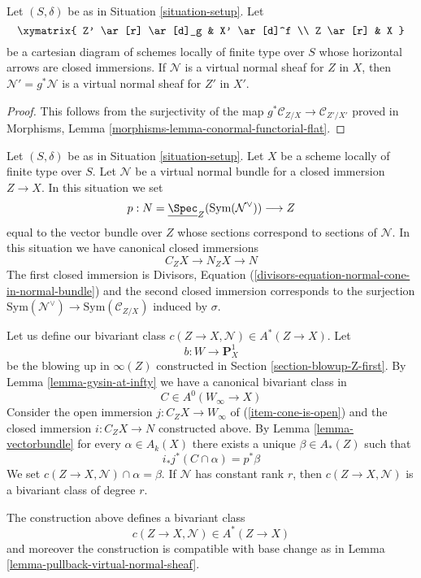 \begin{lemma}
\label{lemma-pullback-virtual-normal-sheaf}
Let $(S, \delta)$ be as in Situation \ref{situation-setup}. Let
$$
\xymatrix{
Z' \ar[r] \ar[d]_g & X' \ar[d]^f \\
Z \ar[r] & X
}
$$
be a cartesian diagram of schemes locally of finite type over $S$
whose horizontal arrows are closed immersions.
If $\mathcal{N}$ is a virtual normal sheaf for $Z$ in $X$, then
$\mathcal{N}' = g^*\mathcal{N}$ is a virtual normal sheaf for
$Z'$ in $X'$.
\end{lemma}

\begin{proof}
This follows from the surjectivity of the map
$g^*\mathcal{C}_{Z/X} \to \mathcal{C}_{Z'/X'}$ proved in
Morphisms, Lemma \ref{morphisms-lemma-conormal-functorial-flat}.
\end{proof}

\noindent
Let $(S, \delta)$ be as in Situation \ref{situation-setup}. Let $X$ be a scheme
locally of finite type over $S$. Let $\mathcal{N}$ be a virtual normal bundle
for a closed immersion $Z \to X$. In this situation we set
$$
p : N = \underline{\Spec}_Z(\text{Sym}(\mathcal{N}^\vee)) \longrightarrow Z
$$
equal to the vector bundle over $Z$
whose sections correspond to sections of $\mathcal{N}$.
In this situation we have canonical closed immersions
$$
C_ZX \longrightarrow N_ZX \longrightarrow N
$$
The first closed immersion is Divisors, Equation
(\ref{divisors-equation-normal-cone-in-normal-bundle})
and the second closed immersion corresponds to the surjection
$\text{Sym}(\mathcal{N}^\vee) \to \text{Sym}(\mathcal{C}_{Z/X})$
induced by $\sigma$.

\medskip\noindent
Let us define our bivariant class $c(Z \to X, \mathcal{N}) \in A^*(Z \to X)$.
Let
$$
b : W \longrightarrow \mathbf{P}^1_X
$$
be the blowing up in $\infty(Z)$ constructed in
Section \ref{section-blowup-Z-first}. By Lemma \ref{lemma-gysin-at-infty}
we have a canonical bivariant class in
$$
C \in A^0(W_\infty \to X)
$$
Consider the open immersion $j : C_ZX \to W_\infty$ of
(\ref{item-cone-is-open}) and the closed immersion
$i : C_ZX \to N$ constructed above. By Lemma \ref{lemma-vectorbundle}
for every $\alpha \in A_k(X)$ there exists a unique
$\beta \in A_*(Z)$ such that
$$
i_*j^*(C \cap \alpha) = p^*\beta
$$
We set $c(Z \to X, \mathcal{N}) \cap \alpha = \beta$.
If $\mathcal{N}$ has constant rank $r$, then $c(Z \to X, \mathcal{N})$
is a bivariant class of degree $r$.

\begin{lemma}
\label{lemma-construction-gysin}
The construction above defines a bivariant class
$$
c(Z \to X, \mathcal{N}) \in A^*(Z \to X)
$$
and moreover the construction is compatible with base change
as in Lemma \ref{lemma-pullback-virtual-normal-sheaf}.
\end{lemma}

